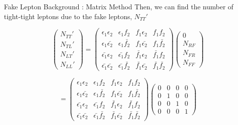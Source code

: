 \documentclass[mathserif,serif]{beamer}
\begin{document}
\begin{frame}{Fake Lepton Background : Matrix Method}
Then, we can find the number of tight-tight leptons due to the fake leptons, $N_{TT}'$

\begin{equation*}
\left( \begin{array}{c}
N_{TT}' \\
N_{TL}' \\
N_{LT}' \\
N_{LL}'
\end{array} \right)
=
\left( \begin{array}{cccc}
\epsilon_1 \epsilon_2 & \epsilon_1 f_2 & f_1 \epsilon_2 & f_1 f_2 \\
\epsilon_1 \bar{\epsilon_2} & \epsilon_1 \bar{f_2} & f_1 \bar{\epsilon_2} & f_1 \bar{f_2} \\
\bar{\epsilon_1} \epsilon_2 & \bar{\epsilon_1} f_2 & \bar{f_1} \epsilon_2 & \bar{f_1} f_2 \\
\bar{\epsilon_1} \bar{\epsilon_2} & \bar{\epsilon_1} \bar{f_2} & \bar{f_1} \bar{\epsilon_2} & \bar{f_1} \bar{f_2}
\end{array} \right)
\left( \begin{array}{c}
0 \\
N_{RF} \\
N_{FR} \\
N_{FF}
\end{array} \right)
\end{equation*}

\begin{equation*}
=
\left( \begin{array}{cccc}
\epsilon_1 \epsilon_2 & \epsilon_1 f_2 & f_1 \epsilon_2 & f_1 f_2 \\
\epsilon_1 \bar{\epsilon_2} & \epsilon_1 \bar{f_2} & f_1 \bar{\epsilon_2} & f_1 \bar{f_2} \\
\bar{\epsilon_1} \epsilon_2 & \bar{\epsilon_1} f_2 & \bar{f_1} \epsilon_2 & \bar{f_1} f_2 \\
\bar{\epsilon_1} \bar{\epsilon_2} & \bar{\epsilon_1} \bar{f_2} & \bar{f_1} \bar{\epsilon_2} & \bar{f_1} \bar{f_2}
\end{array} \right)
\left( \begin{array}{cccc}
0 & 0 & 0 & 0 \\
0 & 1 & 0 & 0 \\
0 & 0 & 1 & 0 \\
0 & 0 & 0 & 1
\end{array} \right)
\end{equation*}


\end{frame}
\end{document}
